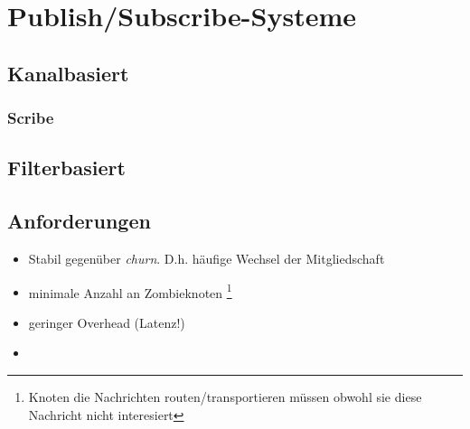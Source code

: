 \section{Publish/Subscribe-Systeme}

\subsection{Kanalbasiert}
\subsubsection{Scribe}
\cite{citeulike:345316} %


\subsection{Filterbasiert}
\cite{citeulike:854573}
\cite{citeulike:6674153} %
\cite{citeulike:4291} %

\subsection{Anforderungen}
\begin{itemize}
\item Stabil gegenüber \emph{churn}. D.h. häufige Wechsel der Mitgliedschaft
\item minimale Anzahl an Zombieknoten \footnote{Knoten die Nachrichten routen/transportieren müssen obwohl sie diese Nachricht nicht interesiert}
\item geringer Overhead (Latenz!)
\item 
\end{itemize}
